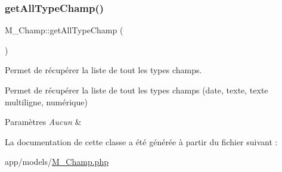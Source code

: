 \subsubsection{\texorpdfstring{get\+All\+Type\+Champ()}{getAllTypeChamp()}}
{\footnotesize\ttfamily M\+\_\+\+Champ\+::get\+All\+Type\+Champ (\begin{DoxyParamCaption}{ }\end{DoxyParamCaption})}



Permet de récupérer la liste de tout les types champs. 

Permet de récupérer la liste de tout les types champs (date, texte, texte multiligne, numérique) 
\begin{DoxyParams}{Paramètres}
{\em Aucun} & \\
\hline
\end{DoxyParams}


La documentation de cette classe a été générée à partir du fichier suivant \+:\begin{DoxyCompactItemize}
\item 
app/models/\hyperlink{_m___champ_8php}{M\+\_\+\+Champ.\+php}\end{DoxyCompactItemize}
